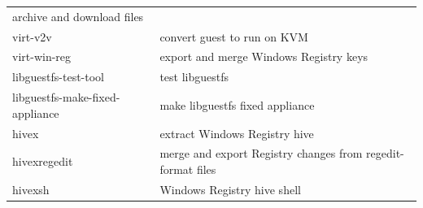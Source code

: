 \documentclass[
  14pt,
  english,
  a4paper,
]{scrreprt}
\begin{document}
\begin{longtable}[]{@{}ll@{}}
\begin{minipage}[t]{0.61\columnwidth}
archive and download files\strut
\end{minipage}\tabularnewline
\begin{minipage}[t]{0.33\columnwidth}\raggedright
virt-v2v\strut
\end{minipage} & \begin{minipage}[t]{0.61\columnwidth}\raggedright
convert guest to run on KVM\strut
\end{minipage}\tabularnewline
\begin{minipage}[t]{0.33\columnwidth}\raggedright
virt-win-reg\strut
\end{minipage} & \begin{minipage}[t]{0.61\columnwidth}\raggedright
export and merge Windows Registry keys\strut
\end{minipage}\tabularnewline
\begin{minipage}[t]{0.33\columnwidth}\raggedright
libguestfs-test-tool\strut
\end{minipage} & \begin{minipage}[t]{0.61\columnwidth}\raggedright
test libguestfs\strut
\end{minipage}\tabularnewline
\begin{minipage}[t]{0.33\columnwidth}\raggedright
libguestfs-make-fixed-appliance\strut
\end{minipage} & \begin{minipage}[t]{0.61\columnwidth}\raggedright
make libguestfs fixed appliance\strut
\end{minipage}\tabularnewline
\begin{minipage}[t]{0.33\columnwidth}\raggedright
hivex\strut
\end{minipage} & \begin{minipage}[t]{0.61\columnwidth}\raggedright
extract Windows Registry hive\strut
\end{minipage}\tabularnewline
\begin{minipage}[t]{0.33\columnwidth}\raggedright
hivexregedit\strut
\end{minipage} & \begin{minipage}[t]{0.61\columnwidth}\raggedright
merge and export Registry changes from regedit-format files\strut
\end{minipage}\tabularnewline
\begin{minipage}[t]{0.33\columnwidth}\raggedright
hivexsh\strut
\end{minipage} & \begin{minipage}[t]{0.61\columnwidth}\raggedright
Windows Registry hive shell\strut

\end{minipage}
\end{longtable}
\end{document}
